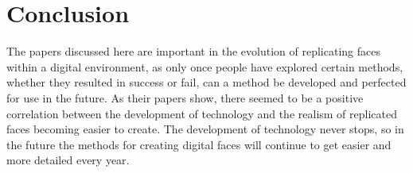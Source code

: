 \documentclass{scrartcl}
\begin{document}
\section{Conclusion}

The papers discussed here are important in the evolution of replicating faces within a digital environment, as only once people have explored certain methods, whether they resulted in success or fail, can a method be developed and perfected for use in the future. As their papers show, there seemed to be a positive correlation between the development of technology and the realism of replicated faces becoming easier to create. The development of technology never stops, so in the future the methods for creating digital faces will continue to get easier and more detailed every year.



\end{document}
